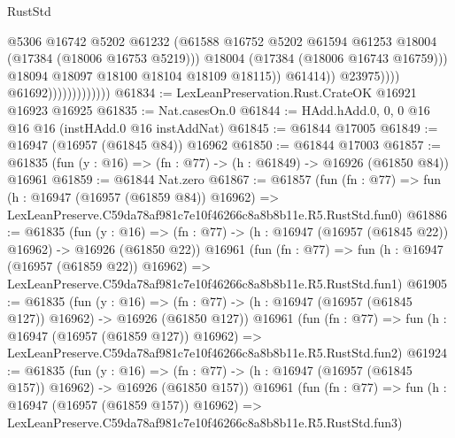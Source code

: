 \begin{lexlean}{RustStd}
\begin{coremodule}
                                                @5306
                                                @16742
                                                @5202
                                                @61232
                                                (@61588
                                                  @16752
                                                  @5202
                                                  @61594
                                                  @61253
                                                  @18004
                                                  (@17384 (@18006 @16753 @5219)))
                                                @18004
                                                (@17384 (@18006 @16743 @16759)))
                                              @18094
                                              @18097
                                              @18100
                                              @18104
                                              @18109
                                              @18115))
                                          @61414))
                                      @23975))))
                              @61692)))))))))))))
@61834 := LexLeanPreservation.Rust.CrateOK @16921 @16923 @16925
@61835 := Nat.casesOn.{0}
@61844 := HAdd.hAdd.{0, 0, 0} @16 @16 @16 (instHAdd.{0} @16 instAddNat)
@61845 := @61844 @17005
@61849 := @16947 (@16957 (@61845 @84)) @16962
@61850 := @61844 @17003
@61857 := @61835 (fun (y : @16) => (fn : @77) -> (h : @61849) -> @16926 (@61850 @84)) @16961
@61859 := @61844 Nat.zero
@61867 := @61857
    (fun (fn : @77) =>
    fun (h : @16947 (@16957 (@61859 @84)) @16962) =>
    LexLeanPreserve.C59da78af981c7e10f46266c8a8b8b11e.R5.RustStd.fun0)
@61886 := @61835
    (fun (y : @16) =>
    (fn : @77) -> (h : @16947 (@16957 (@61845 @22)) @16962) -> @16926 (@61850 @22))
    @16961
    (fun (fn : @77) =>
    fun (h : @16947 (@16957 (@61859 @22)) @16962) =>
    LexLeanPreserve.C59da78af981c7e10f46266c8a8b8b11e.R5.RustStd.fun1)
@61905 := @61835
    (fun (y : @16) =>
    (fn : @77) -> (h : @16947 (@16957 (@61845 @127)) @16962) -> @16926 (@61850 @127))
    @16961
    (fun (fn : @77) =>
    fun (h : @16947 (@16957 (@61859 @127)) @16962) =>
    LexLeanPreserve.C59da78af981c7e10f46266c8a8b8b11e.R5.RustStd.fun2)
@61924 := @61835
    (fun (y : @16) =>
    (fn : @77) -> (h : @16947 (@16957 (@61845 @157)) @16962) -> @16926 (@61850 @157))
    @16961
    (fun (fn : @77) =>
    fun (h : @16947 (@16957 (@61859 @157)) @16962) =>
    LexLeanPreserve.C59da78af981c7e10f46266c8a8b8b11e.R5.RustStd.fun3)

\end{coremodule}
\end{lexlean}

